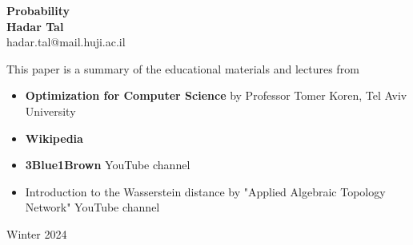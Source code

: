 \documentclass[11pt]{book}
\begin{document}
\begin{titlepage}
    \begin{center}
     {\huge\bfseries 
     Probability \\
     }
     \vspace{1.5cm}
     {\Large\bfseries Hadar Tal}\\[5pt]
     hadar.tal@mail.huji.ac.il\\[14pt]
     \vspace{2cm}
     {This paper is a summary of the educational materials and lectures from 
     \begin{itemize}
        \item \textbf{Optimization for Computer Science} by Professor Tomer Koren, Tel Aviv University
        \item \textbf{Wikipedia}
        \item \textbf{3Blue1Brown} YouTube channel
        \item Introduction to the Wasserstein distance by "Applied Algebraic Topology Network" YouTube channel
     \end{itemize}
     }

     \vfill
    {Winter 2024}
    \end{center}
\end{titlepage}


\frontmatter
\tableofcontents


\mainmatter
\end{document}
